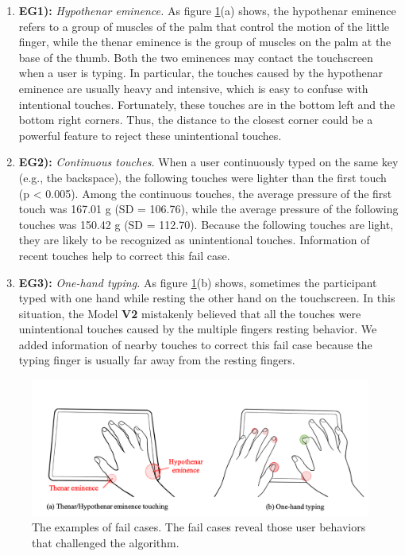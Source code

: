 \begin{enumerate}
	\item{\textbf{EG1):} \emph{Hypothenar eminence.} As figure \ref{fig:fail_case_examples}(a) shows, the hypothenar eminence refers to a group of muscles of the palm that control the motion of the little finger, while the thenar eminence is the group of muscles on the palm at the base of the thumb. Both the two eminences may contact the touchscreen when a user is typing. In particular, the touches caused by the hypothenar eminence are usually heavy and intensive, which is easy to confuse with intentional touches. Fortunately, these touches are in the bottom left and the bottom right corners. Thus, the distance to the closest corner could be a powerful feature to reject these unintentional touches.}
	\item{\textbf{EG2):} \emph{Continuous touches.} When a user continuously typed on the same key (e.g., the backspace), the following touches were lighter than the first touch (p < 0.005). Among the continuous touches, the average pressure of the first touch was 167.01 g (SD = 106.76), while the average pressure of the following touches was 150.42 g (SD = 112.70). Because the following touches are light, they are likely to be recognized as unintentional touches. Information of recent touches help to correct this fail case.}
	\item{\textbf{EG3):} \emph{One-hand typing.} As figure \ref{fig:fail_case_examples}(b) shows, sometimes the participant typed with one hand while resting the other hand on the touchscreen. In this situation, the Model \textbf{V2} mistakenly believed that all the touches were unintentional touches caused by the multiple fingers resting behavior. We added information of nearby touches to correct this fail case because the typing finger is usually far away from the resting fingers.}
\end{enumerate}

\begin{figure}[!tbh]
	\includegraphics[width=1.0\linewidth]{figures/fail_case_examples.png}
	\centering
	\caption{The examples of fail cases. The fail cases reveal those user behaviors that challenged the algorithm.}
	\label{fig:fail_case_examples}
\end{figure}

